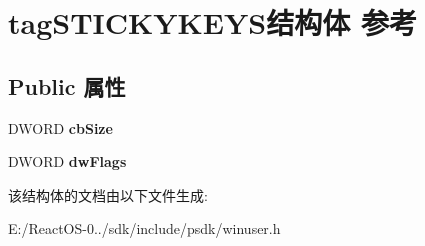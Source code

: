 \hypertarget{structtag_s_t_i_c_k_y_k_e_y_s}{}\section{tag\+S\+T\+I\+C\+K\+Y\+K\+E\+Y\+S结构体 参考}
\label{structtag_s_t_i_c_k_y_k_e_y_s}
\subsection*{Public 属性}
\begin{DoxyCompactItemize}
\item 
\mbox{\label{structtag_s_t_i_c_k_y_k_e_y_s_a359befeafff6b24601e32def99e6d52a}} 
D\+W\+O\+RD {\bfseries cb\+Size}
\item 
\mbox{\label{structtag_s_t_i_c_k_y_k_e_y_s_a115c4c3c473e24a69a0421512c9d009a}} 
D\+W\+O\+RD {\bfseries dw\+Flags}
\end{DoxyCompactItemize}


该结构体的文档由以下文件生成\+:\begin{DoxyCompactItemize}
\item 
E\+:/\+React\+O\+S-\/0../sdk/include/psdk/winuser.\+h\end{DoxyCompactItemize}
